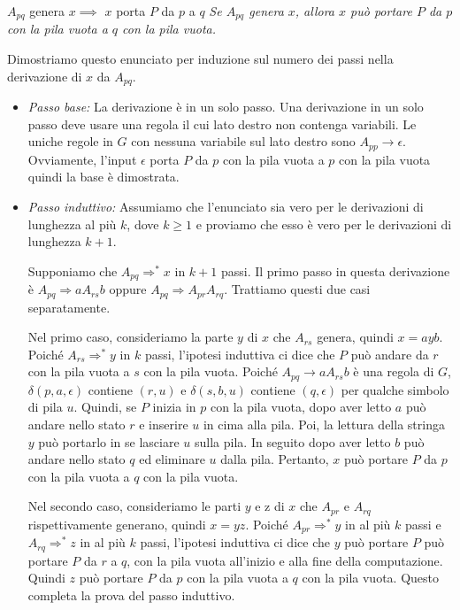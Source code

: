 \begin{Lemma}{$A_{pq}$ genera $x\implies$ $x$ porta $P$ da $p$ a $q$}{}
\textit{Se $A_{pq}$ genera $x$, allora $x$ può portare $P$ da $p$ con la pila vuota a $q$ con la pila vuota.}

Dimostriamo questo enunciato per induzione sul numero dei passi nella derivazione di $x$ da $A_{pq}$.
\begin{itemize}
    \item \textit{Passo base:} La derivazione è in un solo passo. Una derivazione in un solo passo deve usare una regola il cui lato destro non contenga variabili. Le uniche regole in $G$ con nessuna variabile sul lato destro sono $A_{pp}\to\epsilon$. Ovviamente, l'input $\epsilon$ porta $P$ da $p$ con la pila vuota a $p$ con la pila vuota quindi la base è dimostrata.
    \item \textit{Passo induttivo:} Assumiamo che l'enunciato sia vero per le derivazioni di lunghezza al più $k$, dove $k\geq 1$ e proviamo che esso è vero per le derivazioni di lunghezza $k + 1$.

    Supponiamo che $A_{pq}\Rightarrow^* x$ in $k + 1$ passi. Il primo passo in questa derivazione è $A_{pq}\Rightarrow aA_{rs}b$ oppure $A_{pq}\Rightarrow A_{pr} A_{rq}$. Trattiamo questi due casi separatamente.

    Nel primo caso, consideriamo la parte $y$ di $x$ che $A_{rs}$ genera, quindi $x = ayb$. Poiché $A_{rs}\Rightarrow^* y$ in $k$ passi, l'ipotesi induttiva ci dice che $P$ può andare da $r$ con la pila vuota a $s$ con la pila vuota. Poiché $A_{pq}\to aA_{rs} b$ è una regola di $G$, $\delta(p, a,\epsilon)$ contiene $(r, u)$ e $\delta(s, b, u)$ contiene $(q,\epsilon)$ per qualche simbolo di pila $u$. Quindi, se $P$ inizia in $p$ con la pila vuota, dopo aver letto $a$ può andare nello stato $r$ e inserire $u$ in cima alla pila. Poi, la lettura della stringa $y$ può portarlo in se lasciare $u$ sulla pila. In seguito dopo aver letto $b$ può andare nello stato $q$ ed eliminare $u$ dalla pila. Pertanto, $x$ può portare $P$ da $p$ con la pila vuota a $q$ con la pila vuota.

    Nel secondo caso, consideriamo le parti $y$ e z di $x$ che $A_{pr}$ e $A_{rq}$ rispettivamente generano, quindi $x = yz$. Poiché $A_{pr}\Rightarrow^* y$ in al più $k$ passi e $A_{rq}\Rightarrow^* z$ in al più $k$ passi, l'ipotesi induttiva ci dice che $y$ può portare $P$ può portare $P$ da $r$ a $q$, con la pila vuota all'inizio e alla fine della computazione. Quindi $z$ può portare $P$ da $p$ con la pila vuota a $q$ con la pila vuota. Questo completa la prova del passo induttivo.
\end{itemize}
\end{Lemma}

